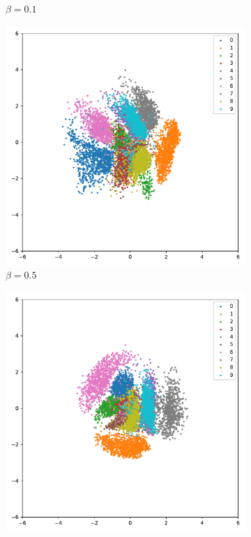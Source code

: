 \begin{figure}[H]
\begin{subfigure}{.28\textwidth}
  \caption{$\beta = 0.1$}
\end{subfigure}
\begin{subfigure}{.28\textwidth}
  \centering
  \includegraphics[width=\textwidth]{gfx/evaluation/feature_space/beta=0.5.pdf}
  \caption{$\beta = 0.5$}
\end{subfigure}
\begin{subfigure}{.28\textwidth}
  \centering
  \includegraphics[width=\textwidth]{gfx/evaluation/feature_space/beta=1.0.pdf}

\end{subfigure}
\end{figure}
